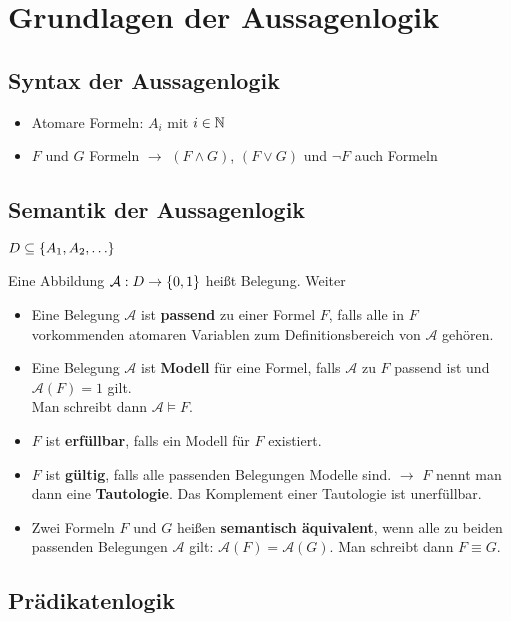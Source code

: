 \chapter{Grundlagen der Aussagenlogik}
\section{Syntax der Aussagenlogik}
\begin{itemize}
	\item Atomare Formeln: $A_i$ mit $i\in\mathbb{N}$
	\item $F$ und $G$ Formeln $\rightarrow$ $(F\wedge G)$, $(F\vee G)$ und $\neg F$ auch Formeln
\end{itemize}
\section{Semantik der Aussagenlogik}
$D\subseteq\left\{ A_1,A_2,\ldots \right\}$

Eine Abbildung $\mathcal A:D\rightarrow\left\{ 0,1 \right\}$ heißt Belegung.
Weiter

\begin{itemize}
	\item Eine Belegung $\mathcal A$ ist \textbf{passend} zu einer  Formel $F$, falls alle in $F$ vorkommenden atomaren Variablen zum Definitionsbereich von $\mathcal A$ gehören.
	\item Eine Belegung $\mathcal A$ ist \textbf{Modell} für eine Formel, falls $\mathcal A$ zu $F$ passend ist und $\mathcal A(F)=1$ gilt.\\
			Man schreibt dann $\mathcal A \vDash F$.
	\item $F$ ist \textbf{erfüllbar}, falls ein Modell für $F$ existiert.
	\item $F$ ist \textbf{gültig}, falls alle passenden Belegungen Modelle sind. $\rightarrow$ $F$ nennt man dann eine  \textbf{Tautologie}. Das Komplement einer Tautologie ist unerfüllbar.
	\item Zwei Formeln $F$ und $G$ heißen \textbf{semantisch äquivalent}, wenn alle zu beiden passenden Belegungen $\mathcal A$ gilt: $\mathcal A(F) = \mathcal A(G)$. Man schreibt dann $F\equiv G$.
\end{itemize}

\section{Prädikatenlogik}

